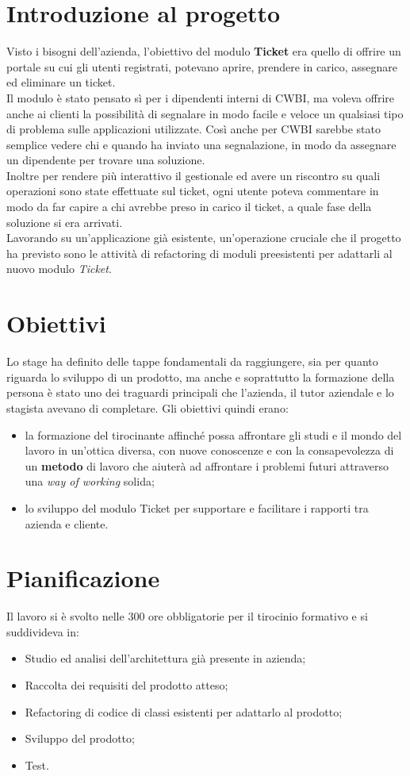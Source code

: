 \section{Introduzione al progetto}
Visto i bisogni dell'azienda, l'obiettivo del modulo \textbf{Ticket} era quello di offrire un portale su cui gli utenti registrati, potevano aprire, prendere in carico, assegnare ed eliminare un ticket. \\
Il modulo è stato pensato sì per i dipendenti interni di CWBI, ma voleva offrire anche ai clienti la possibilità di segnalare in modo facile e veloce un qualsiasi tipo di problema sulle applicazioni utilizzate. Così anche per CWBI sarebbe stato semplice vedere chi e quando ha inviato una segnalazione, in modo da assegnare un dipendente per trovare una soluzione.\\ 
Inoltre per rendere più interattivo il gestionale ed avere un riscontro su quali operazioni sono state effettuate sul ticket, ogni utente poteva commentare in modo da far capire a chi avrebbe preso in carico il ticket, a quale fase della soluzione si era arrivati.\\
Lavorando su un'applicazione già esistente, un'operazione cruciale che il progetto ha previsto sono le attività di refactoring di moduli preesistenti per adattarli al nuovo modulo \textit{Ticket}. 

\section{Obiettivi}
Lo stage ha definito delle tappe fondamentali da raggiungere, sia per quanto riguarda lo sviluppo di un prodotto, ma anche e soprattutto la formazione della persona è stato uno dei traguardi principali che l'azienda, il tutor aziendale e lo stagista avevano di completare. Gli obiettivi quindi erano:
\begin{itemize}
\item la formazione del tirocinante affinché possa affrontare gli studi e il mondo del lavoro in un'ottica diversa, con nuove conoscenze e con la consapevolezza di un \textbf{metodo} di lavoro che aiuterà ad affrontare i problemi futuri attraverso una \textit{way of working} solida;
\item lo sviluppo del modulo Ticket per supportare e facilitare i rapporti tra azienda e cliente.
\end{itemize}


\section{Pianificazione}
Il lavoro si è svolto nelle 300 ore obbligatorie per il tirocinio formativo e si suddivideva in:
\begin{itemize}
\item Studio ed analisi dell'architettura già presente in azienda;
\item Raccolta dei requisiti del prodotto atteso;
\item Refactoring di codice di classi esistenti per adattarlo al prodotto;
\item Sviluppo del prodotto;
\item Test.
\end{itemize}

